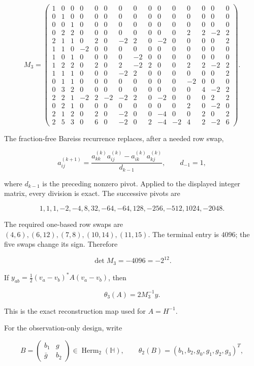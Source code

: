 \documentclass[
  11pt,
]{article}
\begin{document}
\[
M_3=\begin{pmatrix}
1&0&0&0&0&0&0&0&0&0&0&0&0&0&0\\
0&1&0&0&0&0&0&0&0&0&0&0&0&0&0\\
0&0&1&0&0&0&0&0&0&0&0&0&0&0&0\\
0&2&2&0&0&0&0&0&0&0&0&2&2&-2&2\\
2&1&1&0&2&0&-2&2&0&-2&0&0&0&0&2\\
1&1&0&-2&0&0&0&0&0&0&0&0&0&0&0\\
1&0&1&0&0&0&0&-2&0&0&0&0&0&0&0\\
1&2&2&0&2&0&2&-2&2&0&0&2&2&-2&2\\
1&1&1&0&0&0&-2&2&0&0&0&0&0&0&2\\
0&1&1&0&0&0&0&0&0&0&0&-2&0&0&0\\
0&3&2&0&0&0&0&0&0&0&0&0&4&-2&2\\
2&2&1&-2&2&-2&-2&2&0&-2&0&0&0&2&2\\
0&2&1&0&0&0&0&0&0&0&0&2&0&-2&0\\
2&1&2&0&2&0&-2&0&0&-4&0&0&2&0&2\\
2&5&3&0&6&0&-2&0&2&-4&-2&4&2&-2&6
\end{pmatrix}.
\]

The fraction-free Bareiss recurrence replaces, after a needed row swap,

\[
a_{ij}^{(k+1)}=
\frac{a_{kk}^{(k)}a_{ij}^{(k)}-a_{ik}^{(k)}a_{kj}^{(k)}}{d_{k-1}},
\qquad d_{-1}=1,
\]

where \(d_{k-1}\) is the preceding nonzero pivot. Applied to the
displayed integer matrix, every division is exact. The successive pivots
are

\[
1,1,1,-2,-4,8,32,-64,-64,128,-256,-512,1024,-2048.
\]

The required one-based row swaps are
\((4,6),(6,12),(7,8),(10,14),(11,15)\). The terminal entry is \(4096\);
the five swaps change its sign. Therefore

\[
\det M_3=-4096=-2^{12}.
\]

If \(y_{ab}=\frac12(v_a-v_b)^*A(v_a-v_b)\), then

\[
\theta_3(A)=2M_3^{-1}y.
\]

This is the exact reconstruction map used for \(A=H^{-1}\).

For the observation-only design, write

\[
B=\begin{pmatrix}b_1&g\\\bar g&b_2\end{pmatrix}
\in\operatorname{Herm}_2(\mathbb H),
\qquad
\theta_2(B)=(b_1,b_2,g_0,g_1,g_2,g_3)^T,
\]
\end{document}
